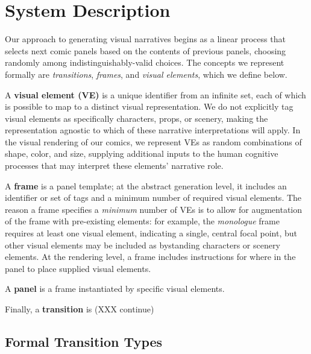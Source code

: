 \section{System Description}

Our approach to generating visual narratives begins as a linear
process that selects next comic panels based on the contents of previous
panels, choosing randomly among indistinguishably-valid choices.
The concepts we represent formally are {\em transitions}, {\em frames}, and
{\em visual elements}, which we define below.


A {\bf visual element (VE)} is a unique identifier from an infinite set,
each of which is possible to map to a distinct visual representation.
We do not explicitly tag visual elements as specifically characters, props,
or scenery, making the representation agnostic to which of these narrative
interpretations will apply. In the visual rendering of our comics, we
represent VEs as random combinations of shape, color, and size, supplying
additional inputs to the human cognitive processes that may interpret these
elements' narrative role.

A {\bf frame} is a panel template; at the abstract generation level, it
includes an identifier or set of tags and a minimum number of required
visual elements. The reason a frame specifies a {\em minimum} number of VEs
is to allow for augmentation of the frame with pre-existing elements: for
example, the {\em monologue} frame requires at least one visual element,
indicating a single, central focal point, but other visual elements may be
included as bystanding characters or scenery elements.
At the rendering level, a frame includes instructions for where in the
panel to place supplied visual elements.

A {\bf panel} is a frame instantiated by specific visual elements.


Finally, a {\bf transition} is (XXX continue)


\subsection{Formal Transition Types}

